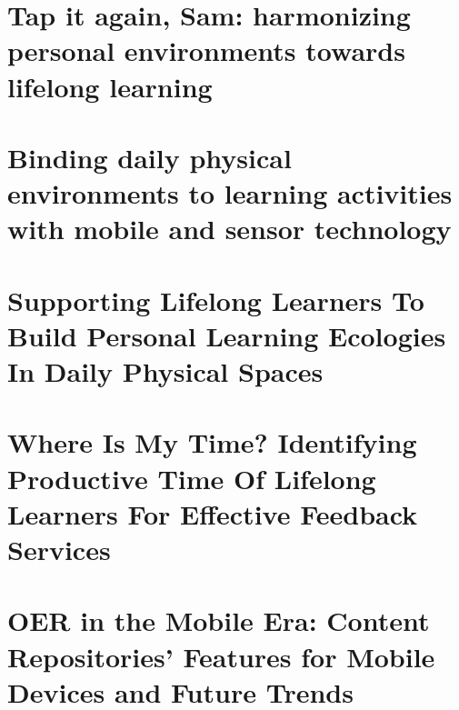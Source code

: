 \documentclass[a4paper,12pt,twoside,openright]{book}
\begin{document}
	\part{Tap it again, Sam: harmonizing personal environments towards lifelong learning}
		
			\clearpage{\pagestyle{empty}\cleardoublepage}				

	\part{Binding daily physical environments to learning activities with mobile and sensor technology}
		
			\clearpage{\pagestyle{empty}\cleardoublepage}	
			

	\part{Supporting Lifelong Learners To Build Personal Learning Ecologies In Daily Physical Spaces}
		
			\clearpage{\pagestyle{empty}\cleardoublepage}	
			

	\part{Where Is My Time? Identifying Productive Time Of Lifelong Learners For Effective Feedback Services}
		
			\clearpage{\pagestyle{empty}\cleardoublepage}	


	\part{OER in the Mobile Era: Content Repositories' Features for Mobile Devices and Future Trends}
		
			\clearpage{\pagestyle{empty}\cleardoublepage}	


						

%		


	

	
\backmatter

	\renewcommand{\bibname}{References}
	
	\clearpage{\pagestyle{empty}\cleardoublepage}

	
		\clearpage{\pagestyle{empty}\cleardoublepage}
\end{document}
